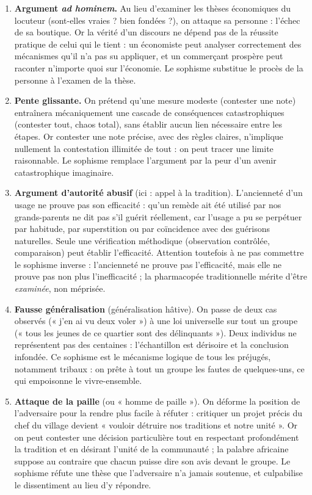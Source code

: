 \documentclass[11pt]{article}
\begin{document}
\begin{corrige}
\begin{enumerate}
\item \textbf{Argument \emph{ad hominem}.} Au lieu d'examiner les thèses économiques du locuteur (sont-elles vraies ? bien fondées ?), on attaque sa personne : l'échec de sa boutique. Or la vérité d'un discours ne dépend pas de la réussite pratique de celui qui le tient : un économiste peut analyser correctement des mécanismes qu'il n'a pas su appliquer, et un commerçant prospère peut raconter n'importe quoi sur l'économie. Le sophisme substitue le procès de la personne à l'examen de la thèse.
\item \textbf{Pente glissante.} On prétend qu'une mesure modeste (contester une note) entraînera mécaniquement une cascade de conséquences catastrophiques (contester tout, chaos total), sans établir aucun lien nécessaire entre les étapes. Or contester une note précise, avec des règles claires, n'implique nullement la contestation illimitée de tout : on peut tracer une limite raisonnable. Le sophisme remplace l'argument par la peur d'un avenir catastrophique imaginaire.
\item \textbf{Argument d'autorité abusif} (ici : appel à la tradition). L'ancienneté d'un usage ne prouve pas son efficacité : qu'un remède ait été utilisé par nos grands-parents ne dit pas s'il guérit réellement, car l'usage a pu se perpétuer par habitude, par superstition ou par coïncidence avec des guérisons naturelles. Seule une vérification méthodique (observation contrôlée, comparaison) peut établir l'efficacité. Attention toutefois à ne pas commettre le sophisme inverse : l'ancienneté ne prouve pas l'efficacité, mais elle ne prouve pas non plus l'inefficacité ; la pharmacopée traditionnelle mérite d'être \emph{examinée}, non méprisée.
\item \textbf{Fausse généralisation} (généralisation hâtive). On passe de deux cas observés (« j'en ai vu deux voler ») à une loi universelle sur tout un groupe (« tous les jeunes de ce quartier sont des délinquants »). Deux individus ne représentent pas des centaines : l'échantillon est dérisoire et la conclusion infondée. Ce sophisme est le mécanisme logique de tous les préjugés, notamment tribaux : on prête à tout un groupe les fautes de quelques-uns, ce qui empoisonne le vivre-ensemble.
\item \textbf{Attaque de la paille} (ou « homme de paille »). On déforme la position de l'adversaire pour la rendre plus facile à réfuter : critiquer un projet précis du chef du village devient « vouloir détruire nos traditions et notre unité ». Or on peut contester une décision particulière tout en respectant profondément la tradition et en désirant l'unité de la communauté ; la palabre africaine suppose au contraire que chacun puisse dire son avis devant le groupe. Le sophisme réfute une thèse que l'adversaire n'a jamais soutenue, et culpabilise le dissentiment au lieu d'y répondre.
\end{enumerate}
\end{corrige}
\end{document}
